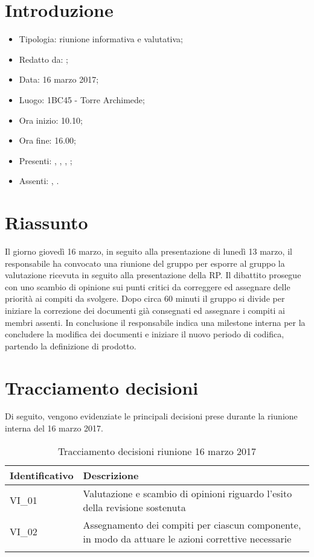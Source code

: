 \section{Introduzione}

	\begin{itemize}
		\item Tipologia: riunione informativa e valutativa;
		\item Redatto da: \NS;
		\item Data: 16 marzo 2017;
		\item Luogo: 1BC45 - Torre Archimede;
		\item Ora inizio: 10.10;
		\item Ora fine: 16.00;
		\item Presenti: \AS, \DS, \NS, \DAN;	
		\item Assenti: \MC, \AN.
	\end{itemize}

\section{Riassunto}
Il giorno giovedì 16 marzo, in seguito alla presentazione di lunedì 13 marzo, il responsabile ha convocato una riunione del gruppo per esporre al gruppo la valutazione ricevuta in seguito alla presentazione della RP. 
Il dibattito prosegue con uno scambio di opinione sui punti critici da correggere ed assegnare delle priorità ai compiti da svolgere. Dopo circa 60 minuti il gruppo si divide per iniziare la correzione dei documenti già consegnati ed assegnare i compiti ai membri assenti.
In conclusione il responsabile indica una milestone interna per la concludere la modifica dei documenti e iniziare il nuovo periodo di codifica, partendo la definizione di prodotto.

\section{Tracciamento decisioni}
Di seguito, vengono evidenziate le principali decisioni prese durante la riunione interna del 16 marzo 2017.

\begin{longtable}{|>{\centering\arraybackslash}p{4cm}|>{\centering\arraybackslash}p{9cm}|}
	\hline \rowcolor{Gray}
	\textbf{Identificativo} & \textbf{Descrizione}\\
	\hline
	\endhead
			VI\_01	& Valutazione e scambio di opinioni riguardo l'esito della revisione sostenuta	\\
			\hline
			VI\_02 & Assegnamento dei compiti per ciascun componente, in modo da attuare le azioni correttive necessarie\\
			\hline
		\caption{Tracciamento decisioni riunione 16 marzo 2017}
\end{longtable}